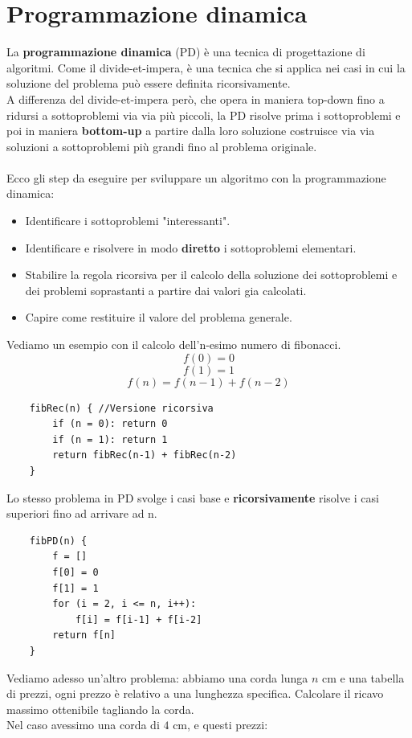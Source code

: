 \documentclass[a4paper,12pt]{article}
\let\oldsection\section
\renewcommand{\section}{\clearpage\oldsection}
\begin{document}
\section{Programmazione dinamica}
La \textbf{programmazione dinamica} (PD) è una tecnica di progettazione di algoritmi. Come il divide-et-impera, è una tecnica che si applica nei casi in cui
la soluzione del problema può essere definita ricorsivamente.\\
A differenza del divide-et-impera però, che opera in maniera top-down fino a ridursi a sottoproblemi via via più piccoli, la PD risolve prima i sottoproblemi e poi in maniera \textbf{bottom-up} a partire dalla loro soluzione costruisce via via soluzioni a sottoproblemi più grandi fino al problema originale.\\\\
Ecco gli step da eseguire per sviluppare un algoritmo con la programmazione dinamica:
\begin{itemize}
    \item Identificare i sottoproblemi "interessanti".
    \item Identificare e risolvere in modo \textbf{diretto} i sottoproblemi elementari.
    \item Stabilire la regola ricorsiva per il calcolo della soluzione dei sottoproblemi e dei problemi soprastanti a partire dai valori gia calcolati.
    \item Capire come restituire il valore del problema generale.
\end{itemize}
Vediamo un esempio con il calcolo dell'n-esimo numero di fibonacci.
\[
f(0) = 0
\]
\[
f(1) = 1
\]
\[
f(n) = f(n-1) + f(n-2)
\]
\begin{lstlisting}
    fibRec(n) { //Versione ricorsiva
        if (n = 0): return 0
        if (n = 1): return 1
        return fibRec(n-1) + fibRec(n-2)
    }
\end{lstlisting}
Lo stesso problema in PD svolge i casi base e \textbf{ricorsivamente} risolve i casi superiori fino ad arrivare ad n.
\begin{lstlisting}
    fibPD(n) {
        f = []
        f[0] = 0
        f[1] = 1
        for (i = 2, i <= n, i++):
            f[i] = f[i-1] + f[i-2]
        return f[n]
    }
\end{lstlisting}
Vediamo adesso un'altro problema: abbiamo una corda lunga $n$ cm e una tabella di prezzi, ogni prezzo è relativo a una lunghezza specifica. Calcolare il ricavo massimo ottenibile tagliando la corda.\\
Nel caso avessimo una corda di $4$ cm, e questi prezzi:
\end{document}
